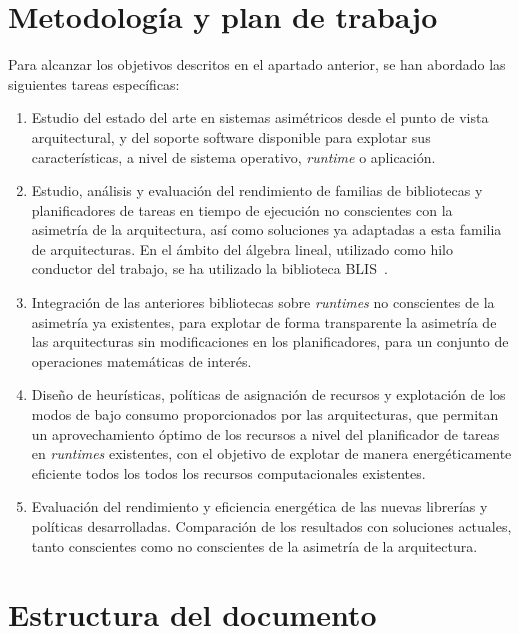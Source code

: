 \section{Metodología y plan de trabajo}
Para alcanzar los objetivos descritos en el apartado anterior, se han
abordado las siguientes tareas específicas:
\begin{enumerate}[T1.]
\item Estudio del estado del arte en sistemas asimétricos desde el punto de
  vista arquitectural, y del soporte software disponible para explotar sus
  características, a nivel de sistema operativo, \emph{runtime} o
  aplicación.
\item Estudio, análisis y evaluación del rendimiento de familias de
  bibliotecas y planificadores de tareas en tiempo de ejecución no
  conscientes con la asimetría de la arquitectura, así como soluciones ya
  adaptadas a esta familia de arquitecturas. En el ámbito del álgebra lineal,
		utilizado como hilo conductor del trabajo, se ha utilizado la
		biblioteca BLIS~\cite{BLIS1}.
\item Integración de las anteriores bibliotecas sobre
  \emph{runtimes} no conscientes de la asimetría ya existentes, para explotar de forma transparente la asimetría de las 
		arquitecturas sin modificaciones en los planificadores, para un
		conjunto de operaciones matemáticas de interés.
\item Diseño de heurísticas, políticas de asignación de recursos y
  explotación de los modos de bajo consumo proporcionados por las
  arquitecturas, que permitan un aprovechamiento óptimo de los recursos a
  nivel del planificador de tareas en \emph{runtimes} existentes, con el
  objetivo de explotar de manera energéticamente eficiente todos los todos
  los recursos computacionales existentes.
\item Evaluación del rendimiento y eficiencia energética de las nuevas
  librerías y políticas desarrolladas. Comparación de los resultados con
  soluciones actuales, tanto conscientes como no conscientes de la
  asimetría de la arquitectura.
\end{enumerate}

\section{Estructura del documento}

